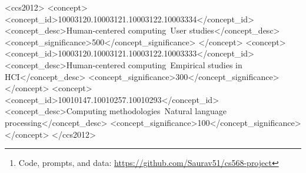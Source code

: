 \documentclass[manuscript,review]{acmart}
\begin{document}
\begin{abstract}
Persona-conditioned LLMs are increasingly used as stand-ins for human participants in HCI research, yet little work has tested whether they replicate the decision-making patterns that actually distinguish real users. We ran a controlled comparison of value-choice coherence between 14 LLM personas (Gemini 2.5 Flash-Lite, 7 expert and 7 novice photographers, 10 runs each) and 14 screened human participants on a multi-attribute camera-purchasing task. All participants ranked 11 camera attributes by personal priority, then selected between 15 camera pairs presented at three complexity levels (3, 6, or 11 visible attributes). We measured alignment between stated priorities and actual choices, how that alignment changed with complexity, and how closely LLM and human patterns matched. On aggregate the two populations appear similar (mean similarity score = 0.953), but the cross-condition Pearson correlation is near zero (\textit{r} = 0.066), and the patterns diverge in direction. Human expert alignment degrades as complexity increases; LLM expert alignment improves. The expert-novice gap reverses sign at the highest complexity level. LLM novice personas are a reasonable proxy for human novices; LLM expert personas are not. These findings show that high-level outcome metrics can mask fundamentally different decision processes, and suggest that evaluating LLM-based synthetic users requires condition-level, process-oriented comparisons rather than aggregate alignment scores.\footnote{Code, prompts, and data: \url{https://github.com/Saurav51/cs568-project}}
\end{abstract}

\begin{CCSXML}
<ccs2012>
<concept>
<concept_id>10003120.10003121.10003122.10003334</concept_id>
<concept_desc>Human-centered computing~User studies</concept_desc>
<concept_significance>500</concept_significance>
</concept>
<concept>
<concept_id>10003120.10003121.10003122.10003333</concept_id>
<concept_desc>Human-centered computing~Empirical studies in HCI</concept_desc>
<concept_significance>300</concept_significance>
</concept>
<concept>
<concept_id>10010147.10010257.10010293</concept_id>
<concept_desc>Computing methodologies~Natural language processing</concept_desc>
<concept_significance>100</concept_significance>
</concept>
</ccs2012>
\end{CCSXML}
\end{document}
